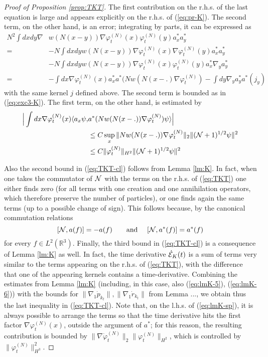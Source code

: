 \documentclass[11pt,a4paper,DIV11]{scrartcl}	%
\newcommand{\bR}{{\mathbb R}}
\newcommand{\cE}{{\cal E}}
\newcommand{\cN}{{\cal N}}
\begin{document}
\begin{proof}[Proof of Proposition \ref{prop:TKT}]
The first contribution on the r.h.s. of the last equation is large and appears explicitly on the r.h.s. of (\ref{eq:pr-K}). The second term, on the other hand, is an error; integrating by parts, it can be expressed as
\[ \begin{split} N^2 \int dx dy \nabla &w (N (x-y)) \nabla \varphi^{(N)}_t (x) \varphi_t^{(N)} (y) a_x^* a_y^* \\ = \; &- N \int dx dy  w (N (x-y)) \nabla \varphi^{(N)}_t (x) \nabla \varphi_t^{(N)} (y) a_x^* a_y^* \\ &- N \int dx dy w (N (x-y)) \nabla \varphi^{(N)}_t (x)  \varphi_t^{(N)} (y) a_x^* \nabla_y a_y^*  \\ = \; &- \int dx \nabla \varphi_t^{(N)} (x) a_x^* a^* (N w(N(x-.) \nabla \varphi_t^{(N)}) - \int dy  \nabla_y a_y^* a^* (j_y) \end{split} \]
with the same kernel $j$ defined above. The second term is bounded as in (\ref{eq:exc3-K}). The first term, on the other hand, is estimated by
\begin{equation}\label{eq:lmK-sp} \begin{split}\Big|   \int dx \nabla \varphi_t^{(N)} (x)  \langle a_x \psi, &a^* (N w(N(x-.)) \nabla \varphi_t^{(N)}) \psi \rangle \Big| \\ &\leq C \sup_x \| N w(N(x-.)) \nabla \varphi_t^{(N)} \|_2 \| (\cN+1)^{1/2} \psi \|^2 \\ &\leq C \| \varphi_t^{(N)} \|_{H^2} \| (\cN+1)^{1/2} \psi \|^2   \end{split} \end{equation}

Also the second bound in (\ref{eq:TKT-cl}) follows from Lemma \ref{lm:K}. In fact, when one takes the commutator of $\cN$ with the terms on the r.h.s. of (\ref{eq:TKT}) one either finds zero (for all terms with one creation and one annihilation operators, which therefore preserve the number of particles), or one finds again the same terms (up to a possible change of sign). This follows because, by the canonical commutation relations
\[ [ \cN , a (f) ] = - a (f) \qquad \text{and } \quad [\cN , a^* (f)] = a^* (f) \]
for every $f \in L^2 (\bR^3)$. Finally, the third bound in (\ref{eq:TKT-cl}) is a consequence of Lemma \ref{lm:K} as well. In fact, the time derivative $\dot{\cE}_K (t)$ is a sum of terms very similar to the terms appearing on the r.h.s. of (\ref{eq:TKT}), with the difference that one of the appearing kernels contains a time-derivative. Combining the estimates from Lemma \ref{lm:K} (including, in this case, also (\ref{eq:lmK-5}), (\ref{eq:lmK-6})) with the bounds for $\| \nabla_1 \dot{p}_{k_t} \|, \| \nabla_1 \dot{r}_{k_t} \|$ from Lemma ..., we obtain thus the last inequality in (\ref{eq:TKT-cl}). Note that, on the l.h.s. of (\ref{eq:lmK-sp}), it is always possible to arrange the terms so that the time derivative hits the first factor $\nabla \varphi_t^{(N)} (x)$, outside the argument of $a^*$; for this reason, the resulting contribution is bounded by $\| \nabla \dot{\varphi}_t^{(N)} \|_2 \| \varphi_t^{(N)} \|_{H^2}$, which is controlled by $\| \varphi_t^{(N)}\|_{H^3}^2$. 
\end{proof}
\end{document}
